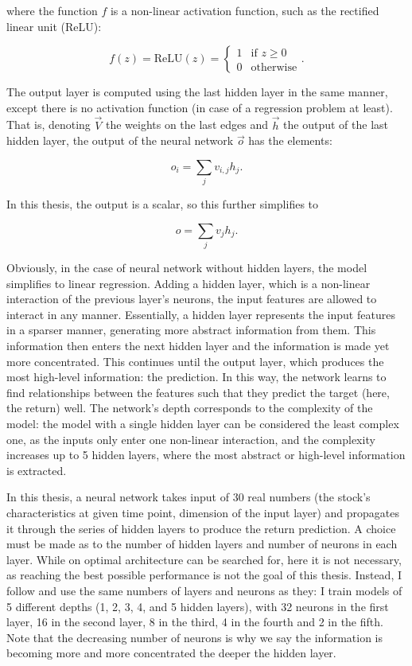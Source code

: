 	where the function $f$ is a non-linear activation function, such as the rectified linear unit (ReLU):
	
	\[
		f(z) = \text{ReLU}(z) =   
			\begin{cases}
				1 & \text{if } z \geq 0\\
				0 & \text{otherwise}
			\end{cases}.
	\]
	
	The output layer is computed using the last hidden layer in the same manner, except there is no activation function (in case of a regression problem at least). That is, denoting $\vec{V}$ the weights on the last edges and $\vec{h}$ the output of the last hidden layer, the output of the neural network $\vec{o}$ has the elements: 
	
	\begin{equation}
		o_i = \sum_{j}v_{i,j} h_j.
	\end{equation}
	
	In this thesis, the output is a scalar, so this further simplifies to 
	
	\begin{equation}
		o = \sum_{j}v_{j} h_j.
	\end{equation}
	
	Obviously, in the case of neural network without hidden layers, the model simplifies to linear regression. Adding a hidden layer, which is a non-linear interaction of the previous layer's neurons, the input features are allowed to interact in any manner. Essentially, a hidden layer represents the input features in a sparser manner, generating more abstract information from them. This information then enters the next hidden layer and the information is made yet more concentrated. This continues until the output layer, which produces the most high-level information: the prediction. In this way, the network learns to find relationships between the features such that they predict the target (here, the return) well. The network's depth corresponds to the complexity of the model: the model with a single hidden layer can be considered the least complex one, as the inputs only enter one non-linear interaction, and the complexity increases up to 5 hidden layers, where the most abstract or high-level information is extracted. 
	
	In this thesis, a neural network takes input of 30 real numbers (the stock's characteristics at given time point, dimension of the input layer) and propagates it through the series of hidden layers to produce the return prediction.	A choice must be made as to the number of hidden layers and number of neurons in each layer. While on optimal architecture can be searched for, here it is not necessary, as reaching the best possible performance is not the goal of this thesis. Instead, I follow \cite{gu2020empirical} and use the same numbers of layers and neurons as they: I train models of 5 different depths (1, 2, 3, 4, and 5 hidden layers), with 32 neurons in the first layer, 16 in the second layer, 8 in the third, 4 in the fourth and 2 in the fifth. Note that the decreasing number of neurons is why we say the information is becoming more and more concentrated the deeper the hidden layer.
	
